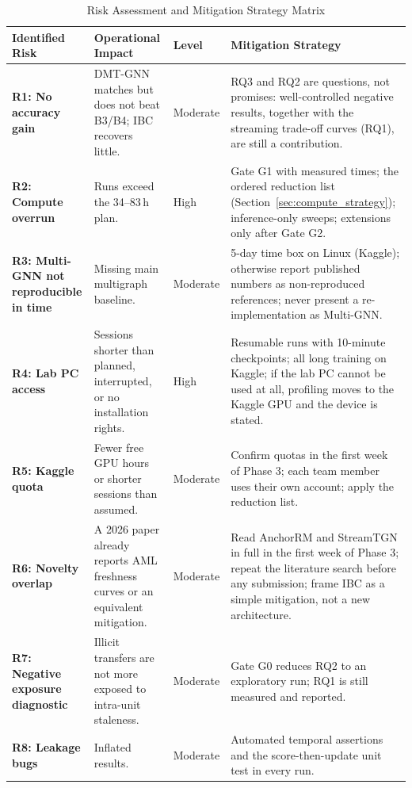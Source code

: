 \documentclass[11pt,a4paper]{article}
\begin{document}
\begin{table}[htbp]
\centering
\small
\caption{Risk Assessment and Mitigation Strategy Matrix}
\label{tab:risk_management}
\begin{tabularx}{\textwidth}{L{2.6cm} L{3.4cm} L{1.4cm} X}
\toprule
\textbf{Identified Risk} & \textbf{Operational Impact} & \textbf{Level} & \textbf{Mitigation Strategy} \\
\midrule
\textbf{R1: No accuracy gain} & DMT-GNN matches but does not beat B3/B4; IBC recovers little. & Moderate & RQ3 and RQ2 are questions, not promises: well-controlled negative results, together with the streaming trade-off curves (RQ1), are still a contribution. \\
\midrule
\textbf{R2: Compute overrun} & Runs exceed the 34--83\,h plan. & High & Gate G1 with measured times; the ordered reduction list (Section~\ref{sec:compute_strategy}); inference-only sweeps; extensions only after Gate G2. \\
\midrule
\textbf{R3: Multi-GNN not reproducible in time} & Missing main multigraph baseline. & Moderate & 5-day time box on Linux (Kaggle); otherwise report published numbers as non-reproduced references; never present a re-implementation as Multi-GNN. \\
\midrule
\textbf{R4: Lab PC access} & Sessions shorter than planned, interrupted, or no installation rights. & High & Resumable runs with 10-minute checkpoints; all long training on Kaggle; if the lab PC cannot be used at all, profiling moves to the Kaggle GPU and the device is stated. \\
\midrule
\textbf{R5: Kaggle quota} & Fewer free GPU hours or shorter sessions than assumed. & Moderate & Confirm quotas in the first week of Phase 3; each team member uses their own account; apply the reduction list. \\
\midrule
\textbf{R6: Novelty overlap} & A 2026 paper already reports AML freshness curves or an equivalent mitigation. & Moderate & Read AnchorRM and StreamTGN in full in the first week of Phase 3; repeat the literature search before any submission; frame IBC as a simple mitigation, not a new architecture. \\
\midrule
\textbf{R7: Negative exposure diagnostic} & Illicit transfers are not more exposed to intra-unit staleness. & Moderate & Gate G0 reduces RQ2 to an exploratory run; RQ1 is still measured and reported. \\
\midrule
\textbf{R8: Leakage bugs} & Inflated results. & Moderate & Automated temporal assertions and the score-then-update unit test in every run. \\

\end{tabularx}
\end{table}
\end{document}

